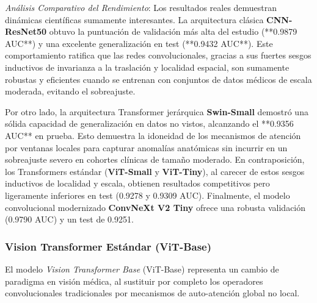 \textit{Análisis Comparativo del Rendimiento}: Los resultados reales demuestran dinámicas científicas sumamente interesantes. La arquitectura clásica \textbf{CNN-ResNet50} obtuvo la puntuación de validación más alta del estudio (**0.9879 AUC**) y una excelente generalización en test (**0.9432 AUC**). Este comportamiento ratifica que las redes convolucionales, gracias a sus fuertes sesgos inductivos de invarianza a la traslación y localidad espacial, son sumamente robustas y eficientes cuando se entrenan con conjuntos de datos médicos de escala moderada, evitando el sobreajuste.

Por otro lado, la arquitectura Transformer jerárquica \textbf{Swin-Small} demostró una sólida capacidad de generalización en datos no vistos, alcanzando el **0.9356 AUC** en prueba. Esto demuestra la idoneidad de los mecanismos de atención por ventanas locales para capturar anomalías anatómicas sin incurrir en un sobreajuste severo en cohortes clínicas de tamaño moderado. En contraposición, los Transformers estándar (\textbf{ViT-Small} y \textbf{ViT-Tiny}), al carecer de estos sesgos inductivos de localidad y escala, obtienen resultados competitivos pero ligeramente inferiores en test (0.9278 y 0.9309 AUC). Finalmente, el modelo convolucional modernizado \textbf{ConvNeXt V2 Tiny} ofrece una robusta validación (0.9790 AUC) y un test de 0.9251.

\subsubsection{Vision Transformer Estándar (ViT-Base)}
El modelo \textit{Vision Transformer Base} (ViT-Base) \cite{dosovitskiy2020image} representa un cambio de paradigma en visión médica, al sustituir por completo los operadores convolucionales tradicionales por mecanismos de auto-atención global no local. 

